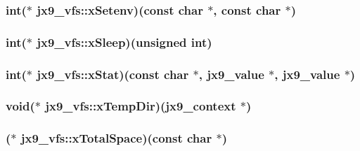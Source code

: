 \hypertarget{structjx9__vfs_a7a4c400e13f121c6707c5251bd2ea08a}{
\subsubsection[{x\-Setenv}]{\setlength{\rightskip}{0pt plus 5cm}int($\ast$ jx9\-\_\-vfs\-::x\-Setenv)(const char $\ast$, const char $\ast$)}}\label{da/d75/structjx9__vfs_a7a4c400e13f121c6707c5251bd2ea08a}
\hypertarget{structjx9__vfs_aa3cd1ef555e39fe9ce2abb2877e850a7}{
\subsubsection[{x\-Sleep}]{\setlength{\rightskip}{0pt plus 5cm}int($\ast$ jx9\-\_\-vfs\-::x\-Sleep)(unsigned int)}}\label{da/d75/structjx9__vfs_aa3cd1ef555e39fe9ce2abb2877e850a7}
\hypertarget{structjx9__vfs_a60629e46759c020f8cd29ec7bd0ba0b9}{
\subsubsection[{x\-Stat}]{\setlength{\rightskip}{0pt plus 5cm}int($\ast$ jx9\-\_\-vfs\-::x\-Stat)(const char $\ast$, {\bf jx9\-\_\-value} $\ast$, {\bf jx9\-\_\-value} $\ast$)}}\label{da/d75/structjx9__vfs_a60629e46759c020f8cd29ec7bd0ba0b9}
\hypertarget{structjx9__vfs_a1b4af9f1186fe361ca3c84474a236c08}{
\subsubsection[{x\-Temp\-Dir}]{\setlength{\rightskip}{0pt plus 5cm}void($\ast$ jx9\-\_\-vfs\-::x\-Temp\-Dir)({\bf jx9\-\_\-context} $\ast$)}}\label{da/d75/structjx9__vfs_a1b4af9f1186fe361ca3c84474a236c08}
\hypertarget{structjx9__vfs_a2942aed70c8a7b61793923b449476a50}{
\subsubsection[{x\-Total\-Space}]{($\ast$ jx9\-\_\-vfs\-::x\-Total\-Space)(const char $\ast$)}}\label{da/d75/structjx9__vfs_a2942aed70c8a7b61793923b449476a50}
